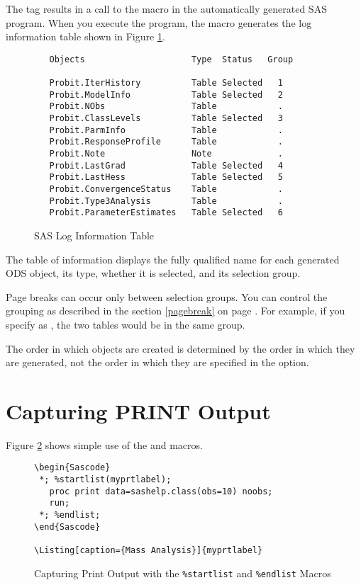 \documentclass[article,oneside]{memoir}
\begin{document}
The  tag results in a call to the  macro in the
automatically generated SAS program. When you execute the program,
the  macro generates the log information table shown in
Figure \ref{loginfo}.
 
\begin{figure}[H]
\begin{snugshade}
\begin{verbatim}
   Objects                     Type  Status   Group

   Probit.IterHistory          Table Selected   1
   Probit.ModelInfo            Table Selected   2
   Probit.NObs                 Table            .
   Probit.ClassLevels          Table Selected   3
   Probit.ParmInfo             Table            .
   Probit.ResponseProfile      Table            .
   Probit.Note                 Note             .
   Probit.LastGrad             Table Selected   4
   Probit.LastHess             Table Selected   5
   Probit.ConvergenceStatus    Table            .
   Probit.Type3Analysis        Table            .
   Probit.ParameterEstimates   Table Selected   6
\end{verbatim}
\end{snugshade}
\caption{SAS Log Information Table}\label{loginfo}
\end{figure}
  
  The table of information displays the fully qualified name for each 
  generated ODS object, its type, whether it is selected, and its 
  selection group. 
  
  Page breaks can occur only between
  selection groups. You can control the grouping
  as described in the section \ref{pagebreak} on page \pageref{pagebreak}.
  For example, if you specify
 as ,
  the two tables would be in the same group.
 
  The order in which objects are created is determined by the 
  order in which they are generated, not the order in which they are 
  specified in the  option.

\section{Capturing PRINT Output}
  Figure \ref{printoutput} shows simple use of the  and 
  macros.
  
\begin{figure}[H]
\begin{snugshade}
\begin{verbatim}
\begin{Sascode}
 *; %startlist(myprtlabel);
   proc print data=sashelp.class(obs=10) noobs;
   run;
 *; %endlist;
\end{Sascode}
 
\Listing[caption={Mass Analysis}]{myprtlabel}
\end{verbatim}
\end{snugshade}
\caption{Capturing Print Output with the \texttt{\%startlist} and 
\texttt{\%endlist} Macros}\label{printoutput}
\end{figure}
  
\end{document}
